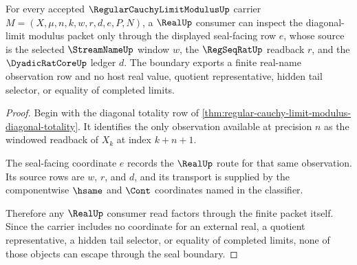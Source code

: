 \begin{theorem}
\label{thm:regular-cauchy-limit-modulus-real-seal-boundary}
For every accepted $\RegularCauchyLimitModulusUp$ carrier $M=(X,\mu,n,k,w,r,d,e,P,N)$, a $\RealUp$ consumer can inspect the diagonal-limit modulus packet only through the displayed seal-facing row $e$, whose source is the selected $\StreamNameUp$ window $w$, the $\RegSeqRatUp$ readback $r$, and the $\DyadicRatCoreUp$ ledger $d$. The boundary exports a finite real-name observation row and no host real value, quotient representative, hidden tail selector, or equality of completed limits.
\end{theorem}
\begin{proof}
Begin with the diagonal totality row of \autoref{thm:regular-cauchy-limit-modulus-diagonal-totality}. It identifies the only observation available at precision $n$ as the windowed readback of $X_k$ at index $k+n+1$.

The seal-facing coordinate $e$ records the $\RealUp$ route for that same observation. Its source rows are $w$, $r$, and $d$, and its transport is supplied by the componentwise $\hsame$ and $\Cont$ coordinates named in the classifier.

Therefore any $\RealUp$ consumer read factors through the finite packet itself. Since the carrier includes no coordinate for an external real, a quotient representative, a hidden tail selector, or equality of completed limits, none of those objects can escape through the seal boundary.
\end{proof}

